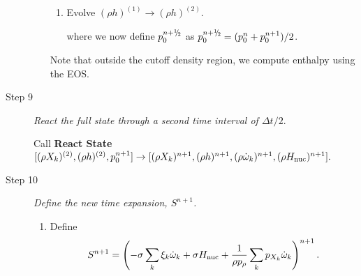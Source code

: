 \documentclass{aastex62}
\newcommand{\sfrac}[2]{\mathchoice
  {\kern0em\raise.5ex\hbox{\the\scriptfont0 #1}\kern-.15em/
   \kern-.15em\lower.25ex\hbox{\the\scriptfont0 #2}}
  {\kern0em\raise.5ex\hbox{\the\scriptfont0 #1}\kern-.15em/
   \kern-.15em\lower.25ex\hbox{\the\scriptfont0 #2}}
  {\kern0em\raise.5ex\hbox{\the\scriptscriptfont0 #1}\kern-.2em/
   \kern-.15em\lower.25ex\hbox{\the\scriptscriptfont0 #2}}
  {#1\!/#2}}
\newcommand{\myhalf}{\sfrac{1}{2}}
\newcommand{\eb}{{\bf{e}}}
\newcommand{\Ub}{{\bf{U}}}
\newcommand{\dt}{\Delta t}
\newcommand{\Hnuc}{H_{\rm nuc}}
\newcommand{\omegadot}{\dot\omega}
\newcommand{\pred}{{\rm pred}}
\newcommand{\nph}{{n+\myhalf}}
\newcommand{\uadvtwo}{\Ub^{\mathrm{ADV}}}
\begin{document}
\begin{description}
\begin{enumerate}
\begin{enumerate}
\item Evolve $(\rho h)^{(1)} \rightarrow (\rho h)^{(2)}$.
where we now define $p_0^\nph$ as $p_0^\nph = (p_0^n+p_0^{n+1})/2$.

\end{enumerate}
Note that outside the cutoff density region, we compute enthalpy using the EOS.

\end{enumerate}

\item[Step 9] {\em React the full state through a second time interval of $\dt / 2.$}

Call {\bf React State}$[(\rho X_k)^{(2)},(\rho h)^{(2)}, p_0^{n+1}] \rightarrow [(\rho X_k)^{n+1}, (\rho h)^{n+1}, (\rho \omegadot_k)^{n+1}, (\rho \Hnuc)^{n+1}].$

\item[Step 10] {\em Define the new time expansion, $S^{n+1}$.}

\begin{enumerate}
\renewcommand{\theenumi}{{\bf \Alph{enumi}}}
\item Define
\begin{equation}
  S^{n+1} =  \left(-\sigma  \sum_k  \xi_k \omegadot_k  + \sigma \Hnuc +
  \frac{1}{\rho p_\rho} \sum_k p_{X_k}  \omegadot_k\right)^{n+1}.
\end{equation}


\end{enumerate}
\end{description}
\end{document}
